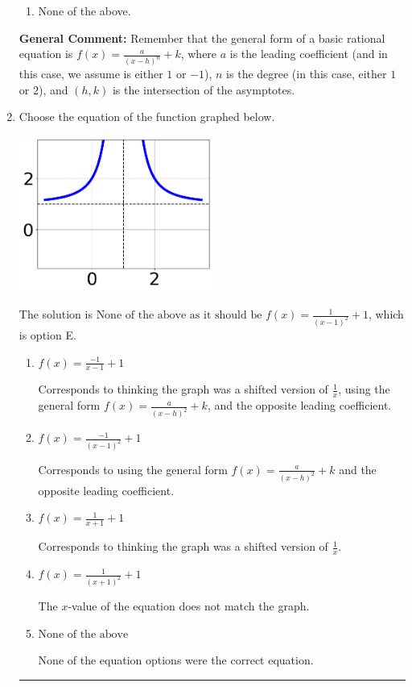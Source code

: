 \documentclass{extbook}[14pt]
\newcommand{\litem}[1]{\item #1

\rule{\textwidth}{0.4pt}}
\begin{document}
\begin{enumerate}
{\begin{enumerate}[label=\Alph*.]
\begin{multicols}{2}
\end{multicols}\item None of the above.\end{enumerate}
\textbf{General Comment:} Remember that the general form of a basic rational equation is $ f(x) = \frac{a}{(x-h)^n} + k$, where $a$ is the leading coefficient (and in this case, we assume is either $1$ or $-1$), $n$ is the degree (in this case, either $1$ or $2$), and $(h, k)$ is the intersection of the asymptotes.
}
\litem{
Choose the equation of the function graphed below.

\begin{center}
    \includegraphics[width=0.5\textwidth]{../Figures/rationalGraphToEquationCopyB.png}
\end{center}


The solution is \( \text{None of the above as it should be } f(x) = \frac{1}{(x - 1)^2} + 1 \), which is option E.\begin{enumerate}[label=\Alph*.]
\item \( f(x) = \frac{-1}{x - 1} + 1 \)

Corresponds to thinking the graph was a shifted version of $\frac{1}{x}$, using the general form $f(x) = \frac{a}{(x-h)^2}+k$, and the opposite leading coefficient.
\item \( f(x) = \frac{-1}{(x - 1)^2} + 1 \)

Corresponds to using the general form $f(x) = \frac{a}{(x-h)^2}+k$ and the opposite leading coefficient.
\item \( f(x) = \frac{1}{x + 1} + 1 \)

Corresponds to thinking the graph was a shifted version of $\frac{1}{x}$.
\item \( f(x) = \frac{1}{(x + 1)^2} + 1 \)

The $x$-value of the equation does not match the graph.
\item \( \text{None of the above} \)

None of the equation options were the correct equation.
\end{enumerate}

}
\end{enumerate}
\end{document}
